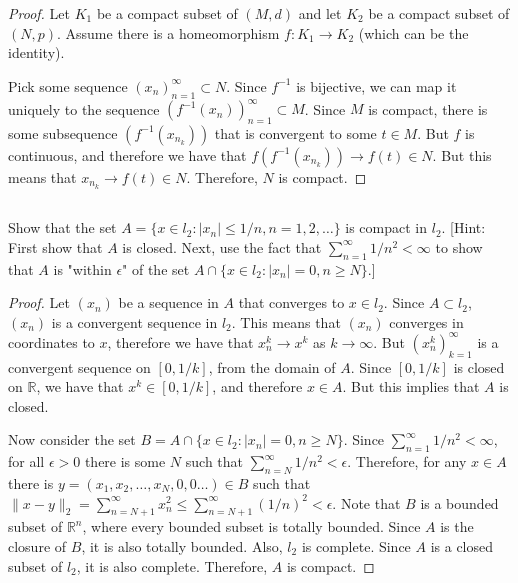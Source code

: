 \begin{proof}
Let $K_1$ be a compact subset of $(M,d)$ and let $K_2$ be a compact subset of $(N,p)$. Assume there is a homeomorphism $f:K_1 \rightarrow K_2$ (which can be the identity).

Pick some sequence $(x_n)_{n=1}^\infty \subset N$. Since $f^{-1}$ is bijective, we can map it uniquely to the sequence $(f^{-1}(x_n))_{n=1}^\infty \subset M$. Since $M$ is compact, there is some subsequence $(f^{-1}(x_{n_k}))$ that is convergent to some $t \in M$. But $f$ is continuous, and therefore we have that $f(f^{-1}(x_{n_k})) \rightarrow f(t) \in N$. But this means that $x_{n_k} \rightarrow f(t) \in N$. Therefore, $N$ is compact.

\end{proof}

\subsection{} Show that the set $A = \{x \in l_2: |x_n| \leq 1/n, n = 1, 2, \dots \}$ is compact in $l_2$. [Hint: First show that $A$ is closed.  Next, use the fact that $\sum_{n=1}^\infty 1/n^2 < \infty$ to show that $A$ is "within $\epsilon$" of the set $A \cap \{x \in l_2: |x_n| = 0, n \geq N\}$.] 

\begin{proof}
Let $(x_n)$ be a sequence in $A$ that converges to $x \in l_2$. Since $A \subset l_2$, $(x_n)$ is a convergent sequence in $l_2$. This means that $(x_n)$ converges in coordinates to $x$, therefore we have that $x_n^k \rightarrow x^k$ as $k \rightarrow \infty$. But $(x_n^k)_{k=1}^\infty$ is a convergent sequence on $[0,1/k]$, from the domain of $A$. Since $[0, 1/k]$ is closed on $\mathbb{R}$, we have that $x^k \in [0,1/k]$, and therefore $x \in A$. But this implies that $A$ is closed.

\vspace{1em}

Now consider the set $B = A \cap \{x \in l_2: |x_n| = 0, n \geq N\}$.
Since $\sum_{n=1}^\infty 1/n^2 < \infty$, for all $\epsilon > 0$ there is some $N$ such that $\sum_{n=N}^\infty 1/n^2 < \epsilon$. Therefore,
for any $x \in A$ there is $y = (x_1, x_2, \dots, x_N, 0, 0 \dots) \in B$ such that $\|x - y\|_2 = \sum_{n=N+1}^\infty x_n^2 \leq \sum_{n=N+1}^\infty (1/n)^2 < \epsilon$. Note that $B$ is a bounded subset of $\mathbb{R}^n$, where every bounded subset is totally bounded. Since $A$ is the closure of $B$, it is also totally bounded. Also, $l_2$ is complete. Since $A$ is a closed subset of $l_2$, it is also complete. Therefore, $A$ is compact.

\end{proof}

